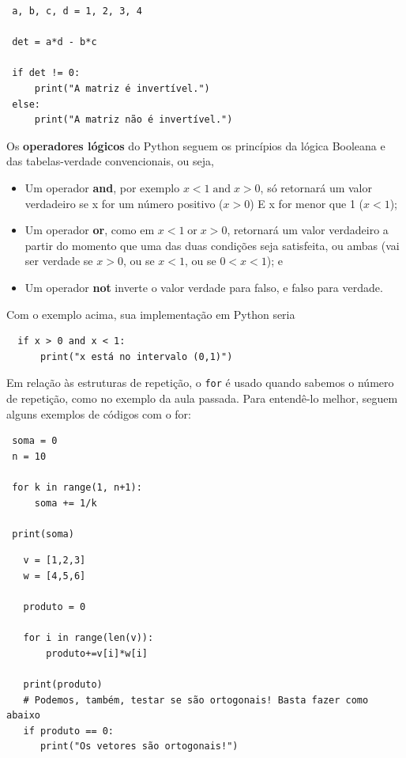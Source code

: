 \documentclass[../numerical_methods.tex]{subfiles}
\begin{document}
\begin{listing}
	\caption{Invertibilidade de matriz 2x2}
	\begin{verbatim}
 a, b, c, d = 1, 2, 3, 4
 
 det = a*d - b*c 

 if det != 0: 
     print("A matriz é invertível.")
 else: 
     print("A matriz não é invertível.")
 \end{verbatim}
\end{listing}

Os \textbf{operadores lógicos} do Python seguem os princípios da lógica Booleana e das tabelas-verdade convencionais, ou seja,
\begin{itemize}
	\item Um operador \textbf{and}, por exemplo \(x < 1 \;\mathrm{and}\; x > 0\), só retornará um valor verdadeiro se x for um número positivo (\(x>0\)) E x for menor que 1 (\(x < 1\));
	\item Um operador \textbf{or}, como em \(x < 1 \;\mathrm{or}\; x > 0\), retornará um valor verdadeiro a partir do momento que uma das duas condições seja satisfeita, ou ambas (vai ser verdade se \(x>0\), ou se \(x<1\), ou se \(0<x<1\)); e
	\item Um operador \textbf{not} inverte o valor verdade para falso, e falso para verdade.
\end{itemize}
Com o exemplo acima, sua implementação em Python seria
\begin{verbatim}
  if x > 0 and x < 1:
      print("x está no intervalo (0,1)")
\end{verbatim}

Em relação às estruturas de repetição, o \texttt{for} é usado quando sabemos o número de repetição, como no exemplo da aula passada. Para entendê-lo melhor, seguem alguns exemplos de códigos com o for:
\begin{listing}[H]
	\caption{Soma parcial da série \(1/n\) de 1 até 10.}
	\begin{verbatim}
 soma = 0 
 n = 10

 for k in range(1, n+1):
     soma += 1/k 

 print(soma)
 \end{verbatim}

	\caption{Produto escalar simples de vetores. }
	\begin{verbatim}
   v = [1,2,3]
   w = [4,5,6]

   produto = 0 

   for i in range(len(v)):
       produto+=v[i]*w[i]

   print(produto)
   # Podemos, também, testar se são ortogonais! Basta fazer como abaixo
   if produto == 0: 
      print("Os vetores são ortogonais!")
   
 \end{verbatim}
\end{listing}
\end{document}
